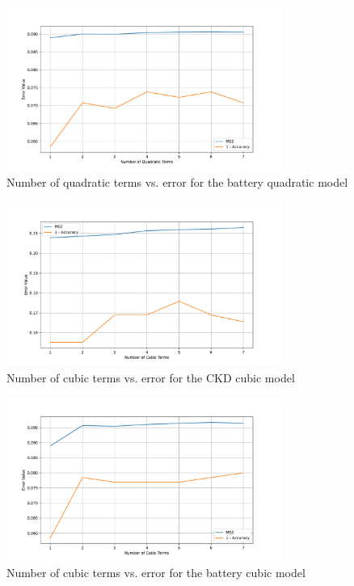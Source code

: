 \documentclass{article}
\begin{document}
\begin{figure}[H]
  \centering
  \includegraphics[width=0.8\textwidth]{quad_battery.pdf}
  \caption{Number of quadratic terms vs. error for the battery quadratic model}
  \label{fig:quad_battery}
\end{figure}

\begin{figure}[H]
  \centering
  \includegraphics[width=0.8\textwidth]{cubic_ckd.pdf}
  \caption{Number of cubic terms vs. error for the CKD cubic model}
  \label{fig:quad_ckd}
\end{figure}

\begin{figure}[H]
  \centering
  \includegraphics[width=0.8\textwidth]{cubic_battery.pdf}
  \caption{Number of cubic terms vs. error for the battery cubic model}
  \label{fig:quad_battery}
\end{figure}
\end{document}
